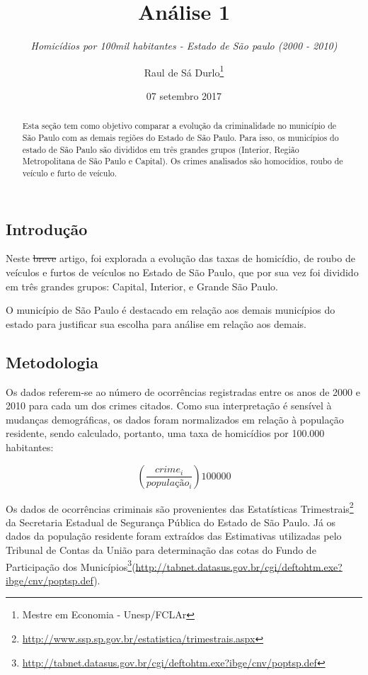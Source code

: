 \documentclass[]{article}
\title{Análise 1}
\subtitle{\emph{Homicídios por 100mil habitantes - Estado de São paulo (2000 -
2010)}}
\author{Raul de Sá Durlo\footnote{Mestre em Economia - Unesp/FCLAr}}
\date{07 setembro 2017}
\let\rmarkdownfootnote\footnote%
\def\footnote{\protect\rmarkdownfootnote}
\begin{document}
\maketitle
\begin{abstract}
Esta seção tem como objetivo comparar a evolução da criminalidade no
município de São Paulo com as demais regiões do Estado de São Paulo.
Para isso, os municípios do estado de São Paulo são divididos em três
grandes grupos (Interior, Região Metropolitana de São Paulo e Capital).
Os crimes analisados são homocídios, roubo de veículo e furto de
veículo.
\end{abstract}

\subsection{Introdução}\label{introducao}

Neste \sout{breve} artigo, foi explorada a evolução das taxas de
homicídio, de roubo de veículos e furtos de veículos no Estado de São
Paulo, que por sua vez foi dividido em três grandes grupos: Capital,
Interior, e Grande São Paulo.

O município de São Paulo é destacado em relação aos demais municípios do
estado para justificar sua escolha para análise em relação aos demais.

\subsection{Metodologia}\label{metodologia}

Os dados referem-se ao número de ocorrências registradas entre os anos
de 2000 e 2010 para cada um dos crimes citados. Como sua interpretação é
sensível à mudanças demográficas, os dados foram normalizados em relação
à população residente, sendo calculado, portanto, uma taxa de homicídios
por 100.000 habitantes:

\[\left(\frac{crime_i}{população_i}\right)100000\]

Os dados de ocorrências criminais são provenientes das Estatísticas
Trimestrais\footnote{\url{http://www.ssp.sp.gov.br/estatistica/trimestrais.aspx}}
da Secretaria Estadual de Segurança Pública do Estado de São Paulo. Já
os dados da população residente foram extraídos das Estimativas
utilizadas pelo Tribunal de Contas da União para determinação das cotas
do Fundo de Participação dos Municípios\footnote{\url{http://tabnet.datasus.gov.br/cgi/deftohtm.exe?ibge/cnv/poptsp.def}}(\url{http://tabnet.datasus.gov.br/cgi/deftohtm.exe?ibge/cnv/poptsp.def}).
\end{document}
